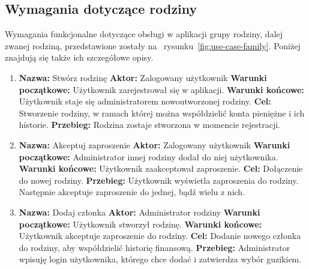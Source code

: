 \subsection{Wymagania dotyczące rodziny}
\label{subsec:wymagania-rodzina}
Wymagania funkcjonalne dotyczące obsługi w aplikacji grupy rodziny, dalej zwanej rodziną, przedstawione zostały na~ rysunku~\ref{fig:use-case-family}. Poniżej znajdują się także ich szczegółowe opisy.

\begin{enumerate}[labelwidth=1em,label=\arabic*.]
\item \textbf{Nazwa:} Stwórz rodzinę \newline
    \textbf{Aktor:} Zalogowany użytkownik \newline
    \textbf{Warunki początkowe:} Użytkownik zarejestrował się w aplikacji. \newline
    \textbf{Warunki końcowe:} Użytkownik staje się administratorem nowoutworzonej rodziny. \newline
    \textbf{Cel:} Stworzenie rodziny, w ramach której można współdzielić konta pieniężne i ich historie. \newline
    \textbf{Przebieg:} Rodzina zostaje stworzona w momencie rejestracji. 
\item \textbf{Nazwa:} Akceptuj zaproszenie \newline
    \textbf{Aktor:} Zalogowany użytkownik \newline
    \textbf{Warunki początkowe:} Administrator innej rodziny dodał do niej użytkownika. \newline
    \textbf{Warunki końcowe:} Użytkownik zaakceptował zaproszenie.  \newline
    \textbf{Cel:} Dołączenie do nowej rodziny. \newline
    \textbf{Przebieg:} Użytkownik wyświetla zaproszenia do rodziny. Następnie akceptuje zaproszenie do jednej, bądź wielu z nich.
\item \textbf{Nazwa:} Dodaj członka \newline
    \textbf{Aktor:} Administrator rodziny \newline
    \textbf{Warunki początkowe:} Użytkownik stworzył rodzinę. \newline
    \textbf{Warunki końcowe:} Użytkownik akceptuje zaproszenie do rodziny.  \newline
    \textbf{Cel:} Dodanie nowego członka do rodziny, aby współdzielić historię finansową. \newline
    \textbf{Przebieg:} Administrator wpisuję login użytkownika, którego chce dodać i zatwierdza wybór guzikiem. 

\end{enumerate}
